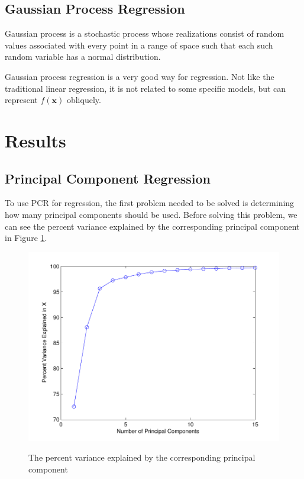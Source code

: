 \documentclass[a4paper]{article}
\newcommand{\bfx}{\mathbf{x}}
\begin{document}
 
\subsection{Gaussian Process Regression}
Gaussian process \cite{rasmussen2006gaussian} is a stochastic process whose realizations consist of random values associated with every point in a range of space such that each such random variable has a normal distribution. 

Gaussian process regression is a very good way for regression. Not like the traditional linear regression, it is not related to some specific models, but can represent $f(\bfx)$ obliquely.

\newpage
\section{Results}
\subsection{Principal Component Regression}
To use PCR for regression, the first problem needed to be solved is determining how many principal components should be used. Before solving this problem, we can see the percent variance explained by the corresponding principal component in Figure \ref{pcrb1}.
\begin{figure}[h]
  \centering
  \includegraphics[width=.6\textwidth]{images/explain_PCR.pdf}\\
  \caption{The percent variance explained by the corresponding principal component}\label{pcrb1}
\end{figure}
\end{document}
